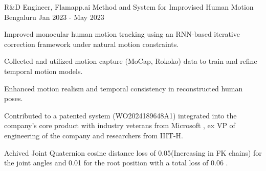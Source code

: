 \begin{cventries}
  \cventry
    {R\&D Engineer, Flamapp.ai} %
    {Method and System for Improvised Human Motion} %
    {Bengaluru} %
    {Jan 2023 - May 2023} %
    {
      \begin{cvitems}
        \item Improved monocular human motion tracking using an RNN-based iterative correction framework under natural motion constraints.
        \item Collected and utilized motion capture (MoCap, Rokoko) data to train and refine temporal motion models.
        \item Enhanced motion realism and temporal consistency in reconstructed human poses.
        \item Contributed to a patented system (WO2024189648A1) integrated into the company’s core product with industry veterans from Microsoft , ex VP of engineering of the company and researchers from IIIT-H.
        \item Achived Joint Quaternion cosine distance loss of 0.05(Increasing in FK chains) for the joint angles and 0.01 for the root position with a total loss of 0.06 .
      \end{cvitems}
    }

\end{cventries}
